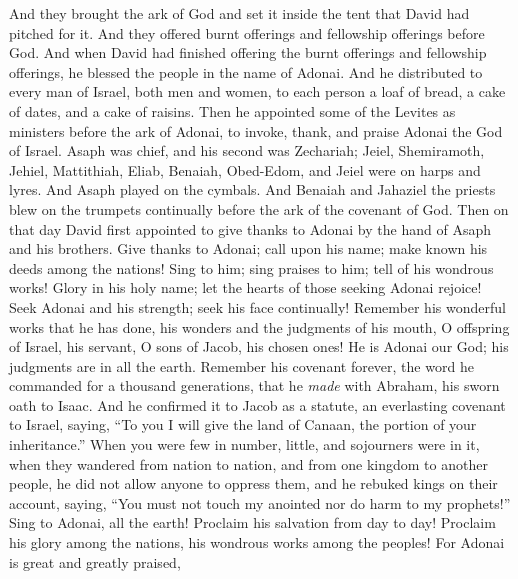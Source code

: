 \begin{biblechapter} %
 And they brought the ark of God and set it inside the tent that David had pitched for it. And they offered burnt offerings and fellowship offerings before God.
\verse And when David had finished offering the burnt offerings and fellowship offerings, he blessed the people in the name of Adonai.
\verse And he distributed to every man of Israel, both men and women, to each person a loaf of bread, a cake of dates, and a cake of raisins.
\verse Then he appointed some of the Levites as ministers before the ark of Adonai, to invoke, thank, and praise Adonai the God of Israel.
\verse Asaph was chief, and his second was Zechariah; Jeiel, Shemiramoth, Jehiel, Mattithiah, Eliab, Benaiah, Obed-Edom, and Jeiel were on harps and lyres. And Asaph played on the cymbals.
\verse And Benaiah and Jahaziel the priests blew on the trumpets continually before the ark of the covenant of God.
\verse Then on that day David first appointed to give thanks to Adonai by the hand of Asaph and his brothers.
 Give thanks to Adonai; call upon his name; 
make known his deeds among the nations!
\verse Sing to him; sing praises to him; 
tell of his wondrous works!
\verse Glory in his holy name; 
let the hearts of those seeking Adonai rejoice!
\verse Seek Adonai and his strength; 
seek his face continually!
\verse Remember his wonderful works that he has done, 
his wonders and the judgments of his mouth,
\verse O offspring of Israel, his servant, 
O sons of Jacob, his chosen ones!
\verse He is Adonai our God; 
his judgments are in all the earth.
\verse Remember his covenant forever, 
the word he commanded for a thousand generations,
\verse that he \textit{made} with Abraham, 
his sworn oath to Isaac.
\verse And he confirmed it to Jacob as a statute, 
an everlasting covenant to Israel,
\verse saying, “To you I will give the land of Canaan, 
the portion of your inheritance.”
\verse When you were few in number, little, 
and sojourners were in it,
\verse when they wandered from nation to nation, 
and from one kingdom to another people,
\verse he did not allow anyone to oppress them, 
and he rebuked kings on their account,
\verse saying, “You must not touch my anointed 
nor do harm to my prophets!”
\verse Sing to Adonai, all the earth! 
Proclaim his salvation from day to day!
\verse Proclaim his glory among the nations, 
his wondrous works among the peoples!
\verse For Adonai is great and greatly praised, 

\end{biblechapter}

